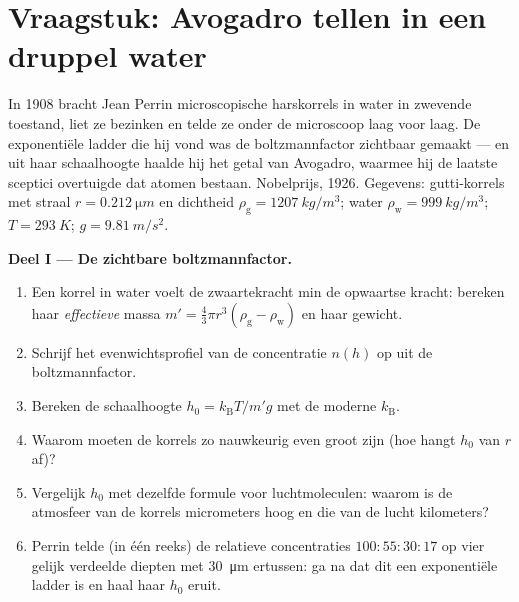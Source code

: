 \section{Vraagstuk: Avogadro tellen in een druppel water}

\begin{problem}\label{pb:b3:canonical-ensemble:1}
In 1908 bracht Jean Perrin microscopische harskorrels in water in
zwevende toestand, liet ze bezinken en telde ze onder de microscoop laag
voor laag. De exponentiële ladder die hij vond was de boltzmannfactor
zichtbaar gemaakt --- en uit haar schaalhoogte haalde hij het getal van
Avogadro, waarmee hij de laatste sceptici overtuigde dat atomen bestaan.
Nobelprijs, 1926. Gegevens: gutti-korrels met straal $r =
\qty{0.212}{\micro m}$ en dichtheid $\rho_{\text{g}} =
\qty{1207}{kg/m^3}$; water $\rho_{\text{w}} = \qty{999}{kg/m^3}$;
$T = \qty{293}{K}$; $g = \qty{9.81}{m/s^2}$.

\medskip\noindent\textbf{Deel I --- De zichtbare boltzmannfactor.}
\begin{enumerate}
  \item Een korrel in water voelt de zwaartekracht min de opwaartse
        kracht: bereken haar \emph{effectieve} massa $m' = \tfrac43\pi r^3(\rho_{\text{g}}
        - \rho_{\text{w}})$ en haar gewicht.
  \item Schrijf het evenwichtsprofiel van de concentratie $n(h)$ op uit de
        boltzmannfactor.
  \item Bereken de schaalhoogte $h_0 = k_{\text{B}}T/m'g$ met de moderne
        $k_{\text{B}}$.
  \item Waarom moeten de korrels zo nauwkeurig even groot zijn (hoe hangt
        $h_0$ van $r$ af)?
  \item Vergelijk $h_0$ met dezelfde formule voor luchtmoleculen: waarom
        is de atmosfeer van de korrels micrometers hoog en die van de lucht
        kilometers?
  \item Perrin telde (in één reeks) de relatieve concentraties
        $100 : 55 : 30 : 17$ op vier gelijk verdeelde diepten met
        \qty{30}{\micro m} ertussen: ga na dat dit een exponentiële ladder
        is en haal haar $h_0$ eruit.
\end{enumerate}


\end{problem}
